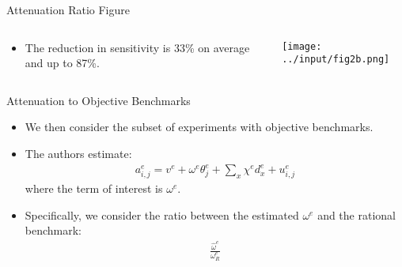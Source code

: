 \documentclass[11pt, aspectratio=169]{beamer}
\begin{document}

\begin{frame}{Attenuation Ratio Figure}
    
    \begin{columns}
    
        \begin{column}{0.3\textwidth}
            \begin{itemize}
                \item The reduction in sensitivity 
                    is 33\% on average and up to 87\%. 
            \end{itemize}
        \end{column}
    
        \begin{column}{0.7\textwidth}
            \texttt{[image: ../input/fig2b.png]}
        \end{column}
    
    \end{columns}

\end{frame}


\begin{frame}{Attenuation to Objective Benchmarks}

    \begin{itemize}
        \item We then consider the subset of experiments 
            with objective benchmarks.
        \item The authors estimate:
            \begin{align}
                a_{i, j}^e=v^e+\omega^e \theta_j^e+\sum_x \chi^e d_x^e+u_{i, j}^e
            \end{align}
            where the term of interest is 
            $\omega^e$.
        \item Specifically, we consider 
            the ratio between the estimated
            $\omega^e$ and the rational benchmark: 
            \begin{align}
                \frac{\hat{\omega}^e}{\omega_R^e}
            \end{align}
    \end{itemize}
    
\end{frame}
\end{document}
